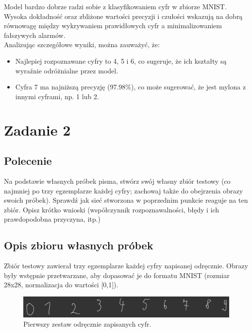 \documentclass{article}
\begin{document}
\noindent Model bardzo dobrze radzi sobie z klasyfikowaniem cyfr w zbiorze MNIST.
Wysoka dokładność oraz zbliżone wartości precyzji i czułości wskazują na dobrą równowagę między wykrywaniem prawidłowych cyfr a minimalizowaniem fałszywych alarmów.\\

\noindent Analizując szczegółowe wyniki, można zauważyć, że:
\begin{itemize}
    \item Najlepiej rozpoznawane cyfry to 4, 5 i 6, co sugeruje, że ich kształty są wyraźnie odróżnialne przez model.
    \item Cyfra 7 ma najniższą precyzję (97.98\%), co może sugerować, że jest mylona z innymi cyframi, np. 1 lub 2.
\end{itemize}

\section{Zadanie 2}
\subsection{Polecenie}
Na podstawie własnych próbek pisma, stwórz swój własny zbiór testowy (co najmniej
po trzy egzemplarze każdej cyfry; zachowaj także do obejrzenia obrazy swoich próbek).
Sprawdź jak sieć stworzona w poprzednim punkcie reaguje na ten zbiór. Opisz krótko wnioski
(współczynnik rozpoznawalności, błędy i ich prawdopodobna przyczyna, itp.)

\subsection{Opis zbioru własnych próbek}
Zbiór testowy zawierał trzy egzemplarze każdej cyfry napisanej odręcznie. Obrazy były wstępnie przetwarzane, aby dopasować je do formatu MNIST (rozmiar 28x28, normalizacja do wartości [0,1]).

\begin{figure}[H]
\centering
\includegraphics[width=\textwidth]{digits.png}
\caption{Pierwszy zestaw odręcznie zapisanych cyfr.}
\end{figure}
\end{document}
